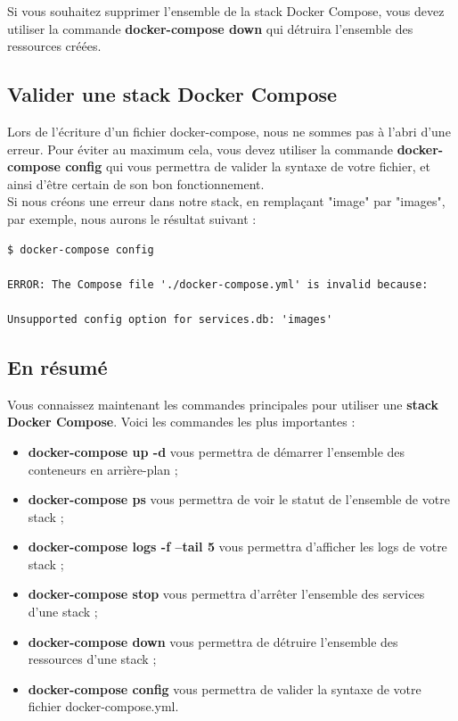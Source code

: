 \documentclass[12pt,a4paper]{article}
\begin{document}
Si vous souhaitez supprimer l'ensemble de la stack Docker Compose, vous devez utiliser la commande \textbf{docker-compose down} qui détruira l'ensemble des ressources créées.\\

\subsection{Valider une stack Docker Compose}
Lors de l'écriture d'un fichier docker-compose, nous ne sommes pas à l’abri d'une erreur. Pour éviter au maximum cela, vous devez utiliser la commande \textbf{docker-compose config} qui vous permettra de valider la syntaxe de votre fichier, et ainsi d'être certain de son bon fonctionnement.\\

Si nous créons une erreur dans notre stack, en remplaçant "image" par "images", par exemple, nous aurons le résultat suivant :

\begin{verbatim}
$ docker-compose config

ERROR: The Compose file './docker-compose.yml' is invalid because:

Unsupported config option for services.db: 'images'
\end{verbatim}

\subsection{En résumé}
Vous connaissez maintenant les commandes principales pour utiliser une \textbf{stack Docker Compose}. Voici les commandes les plus importantes :
\begin{itemize}
\item \textbf{docker-compose up -d} vous permettra de démarrer l'ensemble des conteneurs en arrière-plan ;
\item \textbf{docker-compose ps} vous permettra de voir le statut de l'ensemble de votre stack ;
\item \textbf{docker-compose logs -f --tail 5} vous permettra d'afficher les logs de votre stack ;
\item \textbf{docker-compose stop} vous permettra d'arrêter l'ensemble des services d'une stack ;
\item \textbf{docker-compose down} vous permettra de détruire l'ensemble des ressources d'une stack ;
\item \textbf{docker-compose config} vous permettra de valider la syntaxe de votre fichier docker-compose.yml.
\end{itemize}
\end{document}
